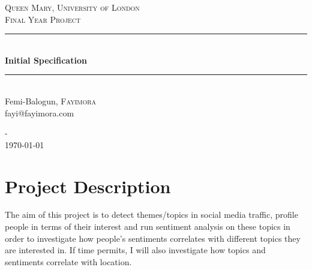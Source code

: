 \documentclass[12pt, a4paper]{article}
\begin{document}
\begin{titlepage}

\newcommand{\HRule}{\rule{\linewidth}{1mm}}
\center%


\textsc{\LARGE Queen Mary, University of London}\\[1.5cm]
\textsc{\large Final Year Project}\\[0.5cm]


\HRule\\[0.4cm]
{\huge \bfseries Initial Specification}\\[0.4cm] %
\HRule\\[1.5cm]

Femi-Balogun, \textsc{Fayimora}\\[0.2cm]
fayi@fayimora.com

\vfill

-\\
{\large \today}\\[3cm]

\end{titlepage}

\tableofcontents
\newpage


\section{Project Description}
The aim of this project is to detect themes/topics in social media traffic, profile people in terms
of their interest and run sentiment analysis on these topics in order to investigate how people's
sentiments correlates with different topics they are interested in. If time permits, I will also
investigate how topics and sentiments correlate with location.
\end{document}
